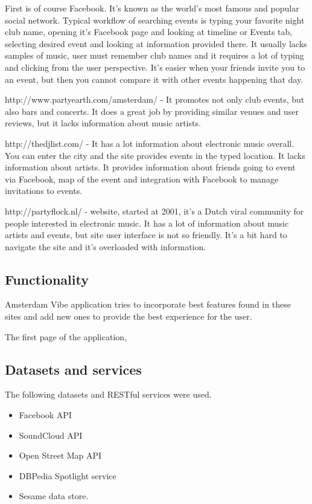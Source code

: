 \documentclass[12pt, a4paper, lithuanian]{article}
\begin{document}
  First is of course Facebook. It's known as the world's most famous and popular social network. Typical workflow of searching events is typing your favorite night club name, opening it's Facebook page and looking at timeline or Events tab, selecting desired event and looking at information provided there. It usually lacks samples of music, user must remember club names and it requires a lot of typing and clicking from the user perspective. It's easier when your friends invite you to an event, but then you cannot compare it with other events happening that day.

  http://www.partyearth.com/amsterdam/ - It promotes not only club events, but also bars and concerts. It does a great job by providing similar venues and user reviews, but it lacks information about music artists.

  http://thedjlist.com/ - It has a lot information about electronic music overall. You can enter the city and the site provides events in the typed location. It lacks information about artists. It provides information about friends going to event via Facebook, map of the event and integration with Facebook to manage invitations to events. 

  http://partyflock.nl/ - website, started at 2001, it's a Dutch viral community for people interested in electronic music. It has a lot of information about music artists and events, but site user interface is not so friendly. It's a bit hard to navigate the site and it's overloaded with information.

\subsection{Functionality}

  Amsterdam Vibe application tries to incorporate best features found in these sites and add new ones to provide the best experience for the user.

  The first page of the application, 

\subsection{Datasets and services}

  The following datasets and RESTful services were used.

\begin{itemize}

  \item Facebook API

  \item SoundCloud API

  \item Open Street Map API

  \item DBPedia Spotlight service

  \item Sesame data store.

\end{itemize}
\end{document}
